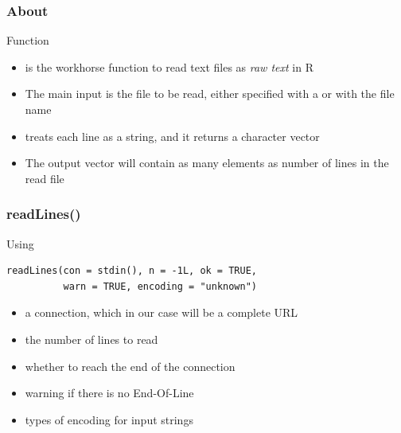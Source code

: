 \documentclass{beamer}\usepackage[]{graphicx}\usepackage[]{color}
\begin{document}
\begin{frame}
\frametitle{About }

\begin{block}{Function }
\begin{itemize}
 \item {} is the workhorse function to read text files as \textit{raw text} in R

 \item The main input is the file to be read, either specified with a  or with the file name 

\item {} treats each line as a string, and it returns a character vector

 \item The output vector will contain as many elements as number of lines in the read file
\end{itemize}
\end{block}

\end{frame}


\begin{frame}[fragile]
\frametitle{readLines()}

\begin{block}{Using }
 \begin{verbatim}
readLines(con = stdin(), n = -1L, ok = TRUE, 
          warn = TRUE, encoding = "unknown")
 \end{verbatim}
\end{block}

\begin{itemize}
 \item {} a connection, which in our case will be a complete URL
 \item {} the number of lines to read
 \item {} whether to reach the end of the connection
 \item {} warning if there is no End-Of-Line
 \item {} types of encoding for input strings
\end{itemize}

\end{frame}

\end{document}
